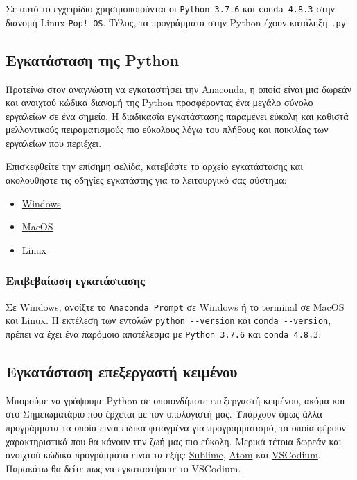 \documentclass[12pt]{extreport}
\begin{document}
Σε αυτό το εγχειρίδιο χρησιμοποιούνται οι \lstinline{Python 3.7.6} και \lstinline{conda 4.8.3} στην διανομή Linux \lstinline{Pop!_OS}. Τέλος, τα προγράμματα στην Python έχουν κατάληξη \lstinline{.py}.

\subsection{Εγκατάσταση της Python}
Προτείνω στον αναγνώστη να εγκαταστήσει την Anaconda, η οποία είναι μια δωρεάν και  ανοιχτού κώδικα διανομή της Python προσφέροντας ένα μεγάλο σύνολο εργαλείων σε ένα σημείο. Η διαδικασία εγκατάστασης παραμένει εύκολη και καθιστά μελλοντικούς πειραματισμούς πιο εύκολους λόγω του πλήθους και ποικιλίας των εργαλείων που περιέχει.

Επισκεφθείτε την \href{https://www.anaconda.com/products/individual#Downloads}{επίσημη σελίδα}, κατεβάστε το αρχείο εγκατάστασης και ακολουθήστε τις οδηγίες εγκατάστης για το λειτουργικό σας σύστημα:

\begin{itemize}
    \item \href{https://docs.anaconda.com/anaconda/install/windows/}{Windows}
    \item \href{https://docs.anaconda.com/anaconda/install/mac-os/}{MacOS}
    \item \href{https://docs.anaconda.com/anaconda/install/linux/}{Linux}
\end{itemize}


\subsubsection{Επιβεβαίωση εγκατάστασης}
Σε Windows, ανοίξτε το \lstinline{Anaconda Prompt} σε Windows ή το terminal σε MacOS και Linux. Η εκτέλεση των εντολών \lstinline{python --version} και \lstinline{conda --version}, πρέπει να έχει ένα παρόμοιο αποτέλεσμα με \lstinline{Python 3.7.6} και \lstinline{conda 4.8.3}.

\subsection{Εγκατάσταση επεξεργαστή κειμένου}
Μπορούμε να γράψουμε Python σε οποιονδήποτε επεξεργαστή κειμένου, ακόμα και στο Σημειωματάριο που έρχεται με τον υπολογιστή μας. Υπάρχουν όμως άλλα προγράμματα τα οποία είναι ειδικά φτιαγμένα για προγραμματισμό, τα οποία φέρουν χαρακτηριστικά που θα κάνουν την ζωή μας πιο εύκολη. Μερικά τέτοια δωρεάν και ανοιχτού κώδικα προγράμματα είναι τα εξής: \href{https://www.sublimetext.com/}{Sublime}, \href{https://atom.io/}{Atom} και \href{https://vscodium.com/}{VSCodium}. Παρακάτω θα δείτε πως να εγκαταστήσετε το VSCodium.
\end{document}
